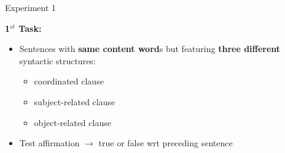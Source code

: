 \begin{frame}{Experiment 1}
\fontsize{12pt}{15}\selectfont

{\large\textbf{1$^{st}$ Task:}}\\
\vspace{0.2cm}
\begin{itemize}
\item Sentences with \textbf{same content word}s but featuring \textbf{three different} syntactic structures:
    \begin{itemize}
        \item coordinated clause
        \item subject-related clause
        \item object-related clause
    \end{itemize}
\item Test affirmation $\rightarrow$ true or false wrt preceding sentence
\end{itemize}
\end{frame}